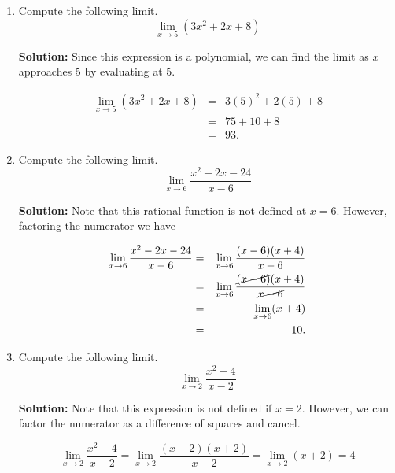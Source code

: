 \documentclass{article}
\begin{document}
\ActivityTitle[class=Calculus I, number=1, name=Limits (Solutions)]

\begin{enumerate}
\item Compute the following limit. \[ \lim_{x \rightarrow 5} \left( 3 x^2 + 2 x + 8 \right) \]

\textbf{Solution:} Since this expression is a polynomial, we can find the limit as $x$ approaches 5 by evaluating at 5.

\begin{eqnarray*}
\lim_{x \rightarrow 5} \left( 3 x^2 + 2 x + 8 \right)
 & = & 3 (5)^2 + 2 (5) + 8 \\
 & = & 75 + 10 + 8 \\
 & = & 93.
\end{eqnarray*}


  
\vspace{1cm}

\item Compute the following limit. \[ \displaystyle\lim_{x \rightarrow 6} \frac{x^2 - 2x - 24}{x - 6} \]

\textbf{Solution:} Note that this rational function is not defined at $x = 6$. However, factoring the numerator we have 

\begin{eqnarray*}
\lim_{x \rightarrow 6} \frac{x^2 - 2x - 24}{x - 6}
 & = & \lim_{x \rightarrow 6} \frac{(x - 6)(x + 4)}{x - 6} \\
 & = & \lim_{x \rightarrow 6} \frac{\cancel{(x - 6)}(x + 4)}{\cancel{x - 6}} \\
 & = & \lim_{x \rightarrow 6} (x + 4) \\
 & = & 10. \\
\end{eqnarray*}


  
\vspace{1cm}

\item Compute the following limit. \[ \lim_{x \rightarrow 2} \frac{x^2 - 4}{x - 2} \]

\textbf{Solution:} Note that this expression is not defined if $x = 2$. However, we can factor the numerator as a difference of squares and cancel.

\[ \lim_{x \rightarrow 2} \frac{x^2 - 4}{x - 2} = \lim_{x \rightarrow 2} \frac{(x - 2)(x + 2)}{x - 2} = \lim_{x \rightarrow 2} (x + 2) = 4 \]



\end{enumerate}
\end{document}
